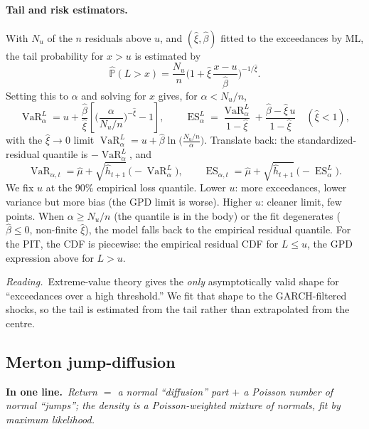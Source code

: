 \documentclass[11pt,a4paper]{article}
\newcommand{\Prob}{\mathbb{P}}
\newcommand{\VaR}{\operatorname{VaR}}
\newcommand{\ES}{\operatorname{ES}}
\newcommand{\intuition}[1]{\par\smallskip\noindent\textit{Reading.}\ #1\par\smallskip}
\newcommand{\inbrief}[1]{\par\noindent\textbf{In one line.}\ \textit{#1}\par\smallskip}
\begin{document}
\paragraph{Tail and risk estimators.} With $N_u$ of the $n$ residuals above $u$,
and $(\hat\xi,\hat\beta)$ fitted to the exceedances by ML, the tail probability
for $x>u$ is estimated by
\begin{equation}
  \widehat{\Prob}(L>x)
  = \frac{N_u}{n}\Big(1 + \hat\xi\,\frac{x-u}{\hat\beta}\Big)^{-1/\hat\xi}.
\end{equation}
Setting this to $\alpha$ and solving for $x$ gives, for $\alpha < N_u/n$,
\begin{equation}
  \VaR^{L}_\alpha
  = u + \frac{\hat\beta}{\hat\xi}
      \left[\Big(\frac{\alpha}{N_u/n}\Big)^{-\hat\xi} - 1\right],
  \qquad
  \ES^{L}_\alpha
  = \frac{\VaR^{L}_\alpha}{1-\hat\xi} + \frac{\hat\beta - \hat\xi\,u}{1-\hat\xi}
  \quad (\hat\xi<1),
\end{equation}
with the $\hat\xi\to0$ limit
$\VaR^{L}_\alpha = u + \hat\beta\ln\!\big(\tfrac{N_u/n}{\alpha}\big)$. Translate
back: the standardized-residual quantile is $-\VaR^{L}_\alpha$, and
\begin{equation}
  \VaR_{\alpha,t} = \hat\mu + \sqrt{\hat h_{t+1}}\,\big({-}\VaR^{L}_\alpha\big),
  \qquad
  \ES_{\alpha,t} = \hat\mu + \sqrt{\hat h_{t+1}}\,\big({-}\ES^{L}_\alpha\big).
\end{equation}
We fix $u$ at the $90\%$ empirical loss quantile. Lower $u$: more exceedances,
lower variance but more bias (the GPD limit is worse). Higher $u$: cleaner limit,
few points. When $\alpha\ge N_u/n$ (the quantile is in the body) or the fit
degenerates ($\hat\beta\le0$, non-finite $\hat\xi$), the model falls back to the
empirical residual quantile. For the PIT, the CDF is piecewise: the empirical
residual CDF for $L\le u$, the GPD expression above for $L>u$.

\intuition{Extreme-value theory gives the \emph{only} asymptotically valid shape
for ``exceedances over a high threshold.'' We fit that shape to the
GARCH-filtered shocks, so the tail is estimated from the tail rather than
extrapolated from the centre.}

\subsection{Merton jump-diffusion}

\inbrief{Return $=$ a normal ``diffusion'' part $+$ a Poisson number of normal
``jumps''; the density is a Poisson-weighted mixture of normals, fit by maximum
likelihood.}
\end{document}
